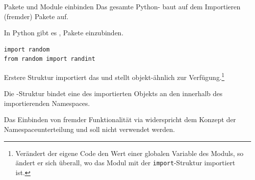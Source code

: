\documentclass[12pt, aspectratio=169, usepdftitle=false]{beamer}
\newcommand{\pp}[1]{\lpl{#1}}
\begin{document}
\begin{frame}[fragile]{Pakete und Module einbinden}
        Das gesamte Python- baut auf dem Importieren (fremder) Pakete auf.

		\medskip
		
		In Python gibt es , Pakete einzubinden.
		
		\medskip
		
		\begin{lstlisting}[language=pytiny]
import random
from random import randint
		\end{lstlisting}
		
		\medskip
		
		Erstere Struktur importiert das  und stellt  objekt-ähnlich zur Verfügung.\footnote{Verändert der eigene Code den Wert einer globalen Variable des Moduls, so ändert er sich überall, wo das Modul mit der \texttt{import}-Struktur importiert ist.}
		
		\medskip
		
		Die \pp{from}-Struktur bindet eine  des importierten Objekts an den  innerhalb des importierenden Namespaces.
		
		\medskip
		
		Das Einbinden von fremder Funktionalität via  \pause widerspricht dem Konzept der Namespaceunterteilung und soll nicht verwendet werden.

	
\end{frame}
\end{document}
